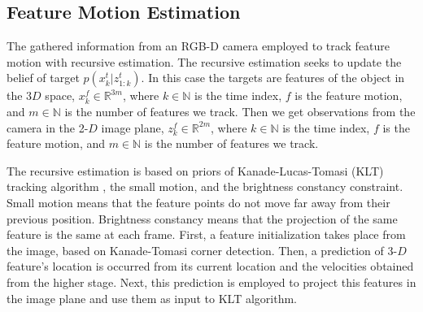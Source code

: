 \documentclass[letterpaper, 10 pt, conference]{ieeeconf}
\begin{document}
\subsection{Feature Motion Estimation}\label{fme}
The gathered information from an RGB-D camera employed to track feature motion with recursive estimation. The recursive estimation seeks to update the belief of target $p(x_k^t|z_{1:k}^t)$. In this case the targets are features of the object in the $3D$ space, $x_k^f \in \mathbb{R}^{3m}$, where $k \in \mathbb{N}$ is the time index, $f$ is the feature motion, and $m \in \mathbb{N}$ is the number of features we track. Then we get observations from the camera in the 2-$D$ image plane, $z_k^f \in \mathbb{R}^{2m}$, where $k \in \mathbb{N}$ is the time index, $f$ is the feature motion, and $m \in \mathbb{N}$ is the number of features we track. 

The recursive estimation is based on priors of Kanade-Lucas-Tomasi (KLT) tracking algorithm \cite{tomasi1991detection}, \cite{lucas1981iterative} the small motion, and the brightness constancy constraint. Small motion means that the feature points do not move far away from their previous position. Brightness constancy means that the projection of the same feature is the same at each frame. 
First, a feature initialization takes place from the image, based on Kanade-Tomasi corner detection. Then, a prediction of 3-$D$ feature's location is occurred from its current location and the velocities obtained from the higher stage. Next, this prediction is employed to project this features in the image plane and use them as input to KLT algorithm. 
\end{document}
